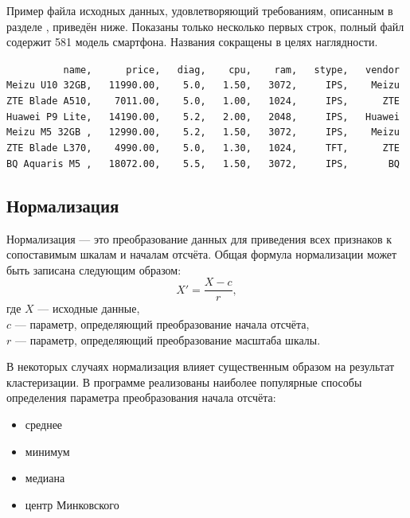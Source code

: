 \documentclass[12pt,tikz]{instruction}
\begin{document}
Пример файла исходных данных, удовлетворяющий требованиям, описанным в разделе , приведён ниже. Показаны только несколько первых строк, полный файл содержит 581 модель смартфона. Названия сокращены в целях наглядности.

\begin{tcolorbox}[colframe=black!50!black,coltext=black!25!black,colback=white,title=\textbf{Пример файла входных данных \SampleFile}]
	\verb|          name,      price,   diag,    cpu,    ram,   stype,   vendor |\\
	\verb|Meizu U10 32GB,   11990.00,    5.0,   1.50,   3072,     IPS,    Meizu |\\
	\verb|ZTE Blade A510,    7011.00,    5.0,   1.00,   1024,     IPS,      ZTE |\\
	\verb|Huawei P9 Lite,   14190.00,    5.2,   2.00,   2048,     IPS,   Huawei |\\
	\verb|Meizu M5 32GB ,   12990.00,    5.2,   1.50,   3072,     IPS,    Meizu |\\
	\verb|ZTE Blade L370,    4990.00,    5.0,   1.30,   1024,     TFT,      ZTE |\\
	\verb|BQ Aquaris M5 ,   18072.00,    5.5,   1.50,   3072,     IPS,       BQ |\\	
\end{tcolorbox}

\subsection{Нормализация}
\label{subsec:norm}
Нормализация --- это преобразование данных для приведения всех признаков к сопоставимым шкалам и началам отсчёта. Общая формула нормализации может быть записана следующим образом:
\begin{equation}\label{eq:normalization}
	X'=\dfrac{X-c}{r},
\end{equation}
\noindent где $X$ --- исходные данные,\\
\phantom{где\space}$c$ --- параметр, определяющий преобразование начала отсчёта,\\
\phantom{где\space}$r$ --- параметр, определяющий преобразование масштаба шкалы.

В некоторых случаях нормализация влияет существенным образом на результат кластеризации. 
В программе \SysName реализованы наиболее популярные способы определения параметра преобразования начала отсчёта:
\begin{itemize}
	\item среднее
	\item минимум
	\item медиана
	\item центр Минковского
\end{itemize}
\end{document}

